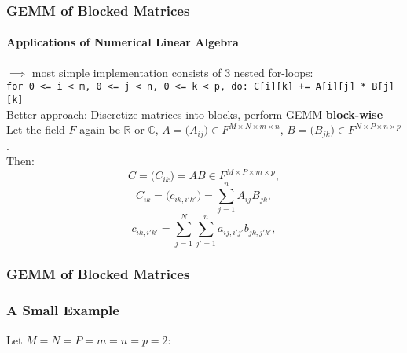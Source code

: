 \begin{frame}
\frametitle{GEMM of Blocked Matrices}
\framesubtitle{Applications of Numerical Linear Algebra}
\(\implies\) most simple implementation consists of 3 nested for-loops: \\
\vspace{0.005cm}\texttt{for 0 <= i < m, 0 <= j < n, 0 <= k < p, do: C[i][k] += A[i][j] * B[j][k]}\\
\vspace{0.25cm}Better approach: Discretize matrices into blocks, perform GEMM \textbf{block-wise}\\
\vspace{0.005cm}Let the field \(F\) again be \(\mathbb{R}\) or \(\mathbb{C}\),
\(A =\big( A_{ij} \big) \in F^{M \times N \times m \times n}\),
\(B =\big( B_{jk} \big) \in F^{N \times P \times n \times p}\).\\
\vspace{0.005cm}Then:
\begin{equation}
 C=\big( C_{ik} \big)=AB \in F^{M \times P \times m \times p},
\end{equation}
\begin{equation}
 C_{ik} = \big( c_{ik,i'k'} \big) = \sum_{j=1}^n{A_{ij}B_{jk}},
\end{equation}
\begin{equation}
 c_{ik,i'k'} = \sum_{j=1}^N{\sum_{j'=1}^n{a_{ij,i'j'}b_{jk,j'k'}},}
\end{equation}
\end{frame}

\begin{frame}
\frametitle{GEMM of Blocked Matrices}
\frametitle{A Small Example}
Let \(M = N = P = m = n = p = 2\):
\vspace{0.3cm}
\begin{center}
\end{center}
\end{frame}

